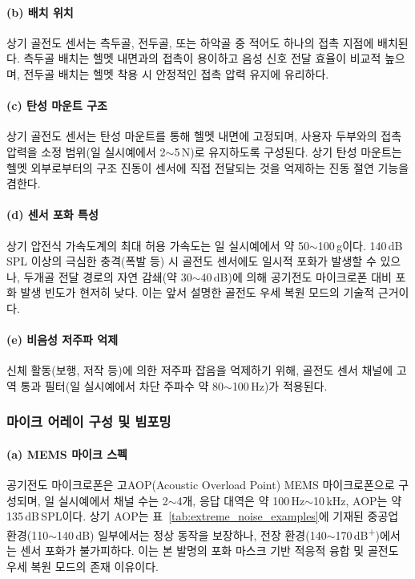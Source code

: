 \documentclass{article}
\begin{document}
\paragraph{(b) 배치 위치}

상기 골전도 센서는 측두골, 전두골, 또는 하악골 중 적어도 하나의 접촉 지점에 배치된다. 측두골 배치는 헬멧 내면과의 접촉이 용이하고 음성 신호 전달 효율이 비교적 높으며, 전두골 배치는 헬멧 착용 시 안정적인 접촉 압력 유지에 유리하다.

\paragraph{(c) 탄성 마운트 구조}

상기 골전도 센서는 탄성 마운트를 통해 헬멧 내면에 고정되며, 사용자 두부와의 접촉 압력을 소정 범위(일 실시예에서 2$\sim$5\,N)로 유지하도록 구성된다. 상기 탄성 마운트는 헬멧 외부로부터의 구조 진동이 센서에 직접 전달되는 것을 억제하는 진동 절연 기능을 겸한다.

\paragraph{(d) 센서 포화 특성}

상기 압전식 가속도계의 최대 허용 가속도는 일 실시예에서 약 50$\sim$100\,g이다. 140\,dB\,SPL 이상의 극심한 충격(폭발 등) 시 골전도 센서에도 일시적 포화가 발생할 수 있으나, 두개골 전달 경로의 자연 감쇄(약 30$\sim$40\,dB)에 의해 공기전도 마이크로폰 대비 포화 발생 빈도가 현저히 낮다. 이는 앞서 설명한 골전도 우세 복원 모드의 기술적 근거이다.

\paragraph{(e) 비음성 저주파 억제}

신체 활동(보행, 저작 등)에 의한 저주파 잡음을 억제하기 위해, 골전도 센서 채널에 고역 통과 필터(일 실시예에서 차단 주파수 약 80$\sim$100\,Hz)가 적용된다.

\subsubsection{마이크 어레이 구성 및 빔포밍}

\paragraph{(a) MEMS 마이크 스펙}

공기전도 마이크로폰은 고AOP(Acoustic Overload Point) MEMS 마이크로폰으로 구성되며, 일 실시예에서 채널 수는 2$\sim$4개, 응답 대역은 약 100\,Hz$\sim$10\,kHz, AOP는 약 135\,dB\,SPL이다. 상기 AOP는 표~\ref{tab:extreme_noise_examples}에 기재된 중공업 환경(110$\sim$140\,dB) 일부에서는 정상 동작을 보장하나, 전장 환경(140$\sim$170\,dB\textsuperscript{+})에서는 센서 포화가 불가피하다. 이는 본 발명의 포화 마스크 기반 적응적 융합 및 골전도 우세 복원 모드의 존재 이유이다.
\end{document}
